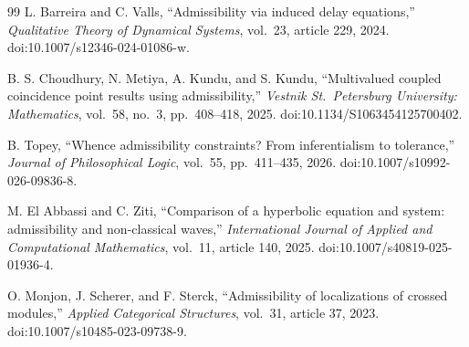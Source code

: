 \documentclass[11pt,a4paper]{article}
\theoremstyle{plain}
\theoremstyle{definition}
\begin{document}
\begin{thebibliography}{99}
L. Barreira and C. Valls,
``Admissibility via induced delay equations,''
\textit{Qualitative Theory of Dynamical Systems},
vol.\ 23, article 229, 2024.
doi:10.1007/s12346-024-01086-w.

B. S. Choudhury, N. Metiya, A. Kundu, and S. Kundu,
``Multivalued coupled coincidence point results using admissibility,''
\textit{Vestnik St.\ Petersburg University: Mathematics},
vol.\ 58, no.\ 3, pp.\ 408--418, 2025.
doi:10.1134/S1063454125700402.

B. Topey,
``Whence admissibility constraints? From inferentialism to tolerance,''
\textit{Journal of Philosophical Logic},
vol.\ 55, pp.\ 411--435, 2026.
doi:10.1007/s10992-026-09836-8.

M. El Abbassi and C. Ziti,
``Comparison of a hyperbolic equation and system:
admissibility and non-classical waves,''
\textit{International Journal of Applied and Computational Mathematics},
vol.\ 11, article 140, 2025.
doi:10.1007/s40819-025-01936-4.

O. Monjon, J. Scherer, and F. Sterck,
``Admissibility of localizations of crossed modules,''
\textit{Applied Categorical Structures},
vol.\ 31, article 37, 2023.
doi:10.1007/s10485-023-09738-9.

\end{thebibliography}
\end{document}

